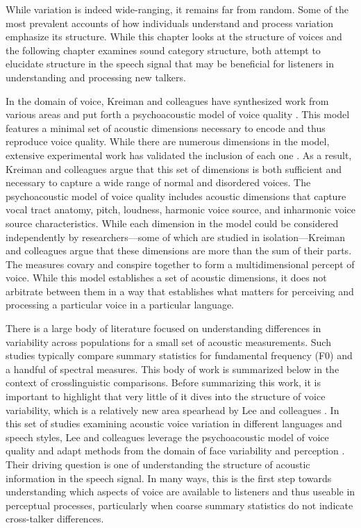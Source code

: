 While variation is indeed wide-ranging, it remains far from random. Some of the most prevalent accounts of how individuals understand and process variation emphasize its structure. While this chapter looks at the structure of voices and the following chapter examines sound category structure, both attempt to elucidate structure in the speech signal that may be beneficial for listeners in understanding and processing new talkers. 

In the domain of voice, Kreiman and colleagues have synthesized work from various areas and put forth a psychoacoustic model of voice quality \citep{kreiman_2014_theory}. This model features a minimal set of acoustic dimensions necessary to encode and thus reproduce voice quality. While there are numerous dimensions in the model, extensive experimental work has validated the inclusion of each one \citep[][and references therein]{kreiman_2021_validating}. As a result, Kreiman and colleagues argue that this set of dimensions is both sufficient and necessary to capture a wide range of normal and disordered voices. The psychoacoustic model of voice quality includes acoustic dimensions that capture vocal tract anatomy, pitch, loudness, harmonic voice source, and inharmonic voice source characteristics. While each dimension in the model could be considered independently by researchers---some of which are studied in isolation---Kreiman and colleagues argue that these dimensions are more than the sum of their parts. The measures covary and conspire together to form a multidimensional percept of voice. While this model establishes a set of acoustic dimensions, it does not arbitrate between them in a way that establishes what matters for perceiving and processing a particular voice in a particular language. 

There is a large body of literature focused on understanding differences in variability across populations for a small set of acoustic measurements. Such studies typically compare summary statistics for fundamental frequency (F0) and a handful of spectral measures. This body of work is summarized below in the context of crosslinguistic comparisons. Before summarizing this work, it is important to highlight that very little of it dives into the structure of voice variability, which is a relatively new area spearhead by Lee and colleagues \citep{lee_2019_acoustic, lee_2019_spontaneous, lee_2020_language}. In this set of studies examining acoustic voice variation in different languages and speech styles, Lee and colleagues leverage the psychoacoustic model of voice quality \citep{kreiman_2014_theory} and adapt methods from the domain of face variability and perception \citep{burton_2016_faces}. Their driving question is one of understanding the structure of acoustic information in the speech signal. In many ways, this is the first step towards understanding which aspects of voice are available to listeners and thus useable in perceptual processes, particularly when coarse summary statistics do not indicate cross-talker differences. 

